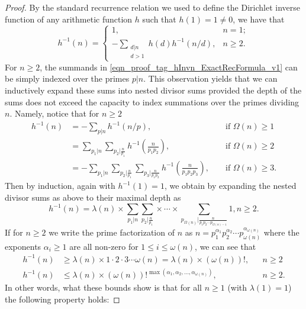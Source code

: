 \documentclass[11pt,reqno,a4letter]{article}
\numberwithin{figure}{section}
\numberwithin{table}{section}
\theoremstyle{plain}
\numberwithin{theorem}{section}
\theoremstyle{definition}
\begin{document}
\begin{proof}
By the standard recurrence relation we used to define the Dirichlet inverse function of any 
arithmetic function $h$ such that $h(1) = 1 \neq 0$, 
we have that 
\begin{equation} 
\label{eqn_proof_tag_hInvn_ExactRecFormula_v1}
h^{-1}(n) = \begin{cases} 
            1, & n = 1; \\ 
            -\sum\limits_{\substack{d|n \\ d>1}} h(d) h^{-1}(n/d), & n \geq 2. 
            \end{cases} 
\end{equation} 
For $n \geq 2$, the summands in \eqref{eqn_proof_tag_hInvn_ExactRecFormula_v1} 
can be simply indexed over the primes $p|n$. This observation yields that we can inductively 
expand these sums into nested divisor sums provided the depth of the sums does not exceed the 
capacity to index summations over the primes dividing $n$. Namely, notice that for $n \geq 2$ 
\begin{align*} 
h^{-1}(n) & = -\sum_{p|n} h^{-1}(n/p), && \text{\ if\ } \Omega(n) \geq 1 \\ 
     & = \sum_{p_1|n} \sum_{p_2|\frac{n}{p_1}} h^{-1}\left(\frac{n}{p_1p_2}\right), && \text{\ if\ } \Omega(n) \geq 2 \\ 
     & = -\sum_{p_1|n} \sum_{p_2|\frac{n}{p_1}} \sum_{p_3|\frac{n}{p_1p_2}} h^{-1}\left(\frac{n}{p_1p_2p_3}\right), 
     && \text{\ if\ } \Omega(n) \geq 3. 
\end{align*} 
Then by induction, again with $h^{-1}(1) = 1$, we obtain by expanding the 
nested divisor sums as above to their maximal depth as 
\[
h^{-1}(n) = \lambda(n) \times \sum_{p_1|n} \sum_{p_2|\frac{n}{p_1}} \times \cdots \times 
     \sum_{p_{\Omega(n)}|\frac{n}{p_1p_2 \cdots p_{\Omega(n)-1}}} 1, n \geq 2. 
\]
If for $n \geq 2$ we write the prime factorization of $n$ as 
$n = p_1^{\alpha_1} p_2^{\alpha_2} \cdots p_{\omega(n)}^{\alpha_{\omega(n)}}$ where the exponents $\alpha_i \geq 1$ are all 
non-zero for $1 \leq i \leq \omega(n)$, we can see that 
\begin{align*} 
h^{-1}(n) & \geq \lambda(n) \times 1 \cdot 2 \cdot 3 \cdots \omega(n) = \lambda(n) \times (\omega(n))!, && n \geq 2 \\ 
h^{-1}(n) & \leq \lambda(n) \times (\omega(n))!^{\max(\alpha_1, \alpha_2, \ldots, \alpha_{\omega(n)})}, && n \geq 2. 
\end{align*} 
In other words, what these bounds show is that for all $n \geq 1$ (with $\lambda(1) = 1$) the following property holds: 

\end{proof}
\end{document}
